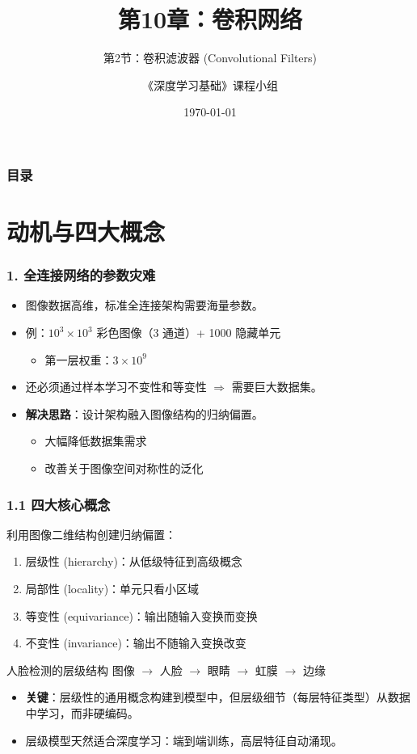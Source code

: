 \documentclass[t,aspectratio=169]{beamer} %
\title[10.2.卷积滤波器]{第10章：卷积网络}
\subtitle{第2节：卷积滤波器 (Convolutional Filters)}
\author{《深度学习基础》课程小组}
\date{\today}
\begin{document}
\frame{\titlepage}

\begin{frame}
    \frametitle{目录}
    \tableofcontents
\end{frame}

\section{动机与四大概念}

\begin{frame}
    \frametitle{1. 全连接网络的参数灾难}
    \begin{itemize}
        \item 图像数据\alert{高维}，标准全连接架构需要\alert{海量参数}。
        \item 例：$10^3 \times 10^3$ 彩色图像（3 通道）+ 1000 隐藏单元
        \begin{itemize}
            \item 第一层权重：$3 \times 10^9$
        \end{itemize}
        \item 还必须\alert{通过样本学习}不变性和等变性 $\Rightarrow$ 需要巨大数据集。
        \item \textbf{解决思路}：设计架构融入\alert{图像结构的归纳偏置}。
        \begin{itemize}
            \item 大幅降低数据集需求
            \item 改善关于图像空间对称性的泛化
        \end{itemize}
    \end{itemize}
\end{frame}

\begin{frame}
    \frametitle{1.1 四大核心概念}
    利用图像二维结构创建归纳偏置：
    \begin{enumerate}
        \item \alert{层级性} (hierarchy)：从低级特征到高级概念
        \item \alert{局部性} (locality)：单元只看小区域
        \item \alert{等变性} (equivariance)：输出随输入变换而变换
        \item \alert{不变性} (invariance)：输出不随输入变换改变
    \end{enumerate}
    \begin{block}{人脸检测的层级结构}
        图像 $\to$ 人脸 $\to$ 眼睛 $\to$ 虹膜 $\to$ 边缘
    \end{block}
    \begin{itemize}
        \item \textbf{关键}：层级性的\alert{通用概念}构建到模型中，但\alert{层级细节}（每层特征类型）从数据中学习，而非硬编码。
        \item 层级模型天然适合深度学习：端到端训练，高层特征自动涌现。
    \end{itemize}
\end{frame}
\end{document}
